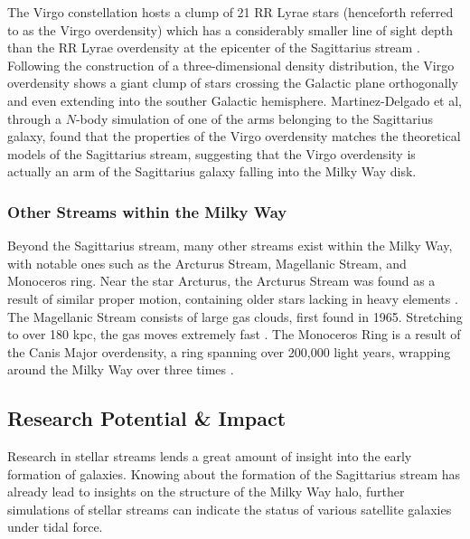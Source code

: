 \documentclass{article}
\begin{document}
\indent The Virgo constellation hosts a clump of 21 RR Lyrae stars (henceforth referred to as the Virgo overdensity) which has a considerably smaller line of sight depth than the RR Lyrae overdensity at the epicenter of the Sagittarius stream \cite{virgoOverdensity}. Following the construction of a three-dimensional density distribution, the Virgo overdensity shows a giant clump of stars crossing the Galactic plane orthogonally and even extending into the souther Galactic hemisphere. Martinez-Delgado et al, through a $N$-body simulation of one of the arms belonging to the Sagittarius galaxy, found that the properties of the Virgo overdensity matches the theoretical models of the Sagittarius stream, suggesting that the Virgo overdensity is actually an arm of the Sagittarius galaxy falling into the Milky Way disk. 

\subsubsection{Other Streams within the Milky Way}
\indent Beyond the Sagittarius stream, many other streams exist within the Milky Way, with notable ones such as the Arcturus Stream, Magellanic Stream, and Monoceros ring. Near the star Arcturus, the Arcturus Stream was found as a result of similar proper motion, containing older stars lacking in heavy elements \cite{ghostOfSagittarius}. The Magellanic Stream consists of large gas clouds, first found in 1965. Stretching to over 180 kpc, the gas moves extremely fast \cite{magellanicStream}. The Monoceros Ring is a result of the Canis Major overdensity, a ring spanning over 200,000 light years, wrapping around the Milky Way over three times \cite{monocerosRing}. 

\subsection{Research Potential \& Impact}
\indent Research in stellar streams lends a great amount of insight into the early formation of galaxies. Knowing about the formation of the Sagittarius stream has already lead to insights on the structure of the Milky Way halo, further simulations of stellar streams can indicate the status of various satellite galaxies under tidal force.

 
 
\end{document}
